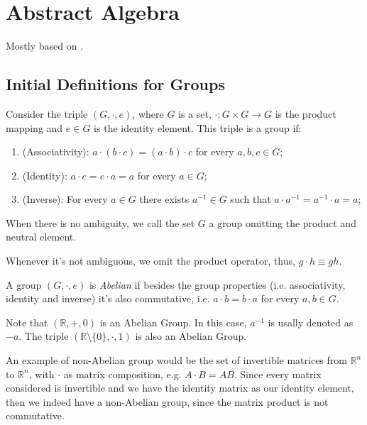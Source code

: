 \chapter{Abstract Algebra}

Mostly based on \citet{aluffi2021algebra}.

\section{Initial Definitions for Groups}

\begin{definition}[Groups]
	Consider the triple $(G, \cdot, e)$, where $G$ is a set,
	$\cdot : G \times G \to G$ is the product mapping
	and $e \in G$ is the identity element.
	This triple is a group if:
	\begin{enumerate}
		\item (Associativity): $a \cdot (b \cdot c) = (a \cdot b) \cdot c$ for every $a,b,c \in G$;
		\item (Identity): $a \cdot e = e \cdot a  = a$ for every $a \in G$;
		\item (Inverse): For every $a \in G$ there exists $a^{-1} \in G$ such that
		      $a\cdot a^{-1} = a^{-1}\cdot a = a$;
	\end{enumerate}

	When there is no ambiguity, we call the set $G$ a group omitting
	the product and neutral element.
\end{definition}

Whenever it's not ambiguous, we omit the product operator,
thus, $g\cdot h \equiv g h$.

\begin{definition}
	A group $(G, \cdot, e)$ is \textit{Abelian} if besides the group properties
	(i.e. associativity, identity and inverse)
	it's also commutative, i.e. $a \cdot b = b \cdot a$ for every $a,b \in G$.
\end{definition}

\begin{example}
	Note that $(\mathbb R, +, 0)$ is an Abelian Group.
	In this case, $a^{-1}$ is usally denoted as $-a$.
	The triple $(\mathbb R \setminus \{0\}, \cdot, 1)$ is also an Abelian Group.

	An example of non-Abelian group would be the set of invertible
	matrices from $\mathbb R^n$ to $\mathbb R^n$,
	with $\cdot$ as matrix composition, e.g.
	$A \cdot B = A B$. Since every matrix considered is invertible
	and we have the identity matrix as our identity element,
	then we indeed have a non-Abelian group,
	since the matrix product is not commutative.
\end{example}

